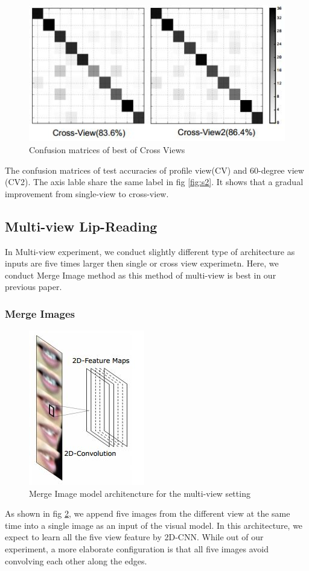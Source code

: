 \begin{figure}[h]
	\centering
	\includegraphics[width=\columnwidth]{fig/c2.jpg}
	\caption{Confusion matrices of best of  Cross Views}
	\label{fig:c2}
\end{figure}
The confusion matrices of test accuracies of profile view(CV) and 60-degree view (CV2). The axis lable share the same label in fig \ref{fig:s2}. It shows that
a gradual improvement from single-view to cross-view.  

\subsection{Multi-view Lip-Reading}
In Multi-view experiment, we conduct slightly different type of architecture as inputs are five times larger then single or cross view experimetn. Here, we conduct Merge Image method as this method of multi-view is best in our previous paper.

\subsubsection*{Merge Images}
\begin{figure}[h]
	\centering
	\includegraphics[width=0.4\columnwidth]{fig/mi.jpg}
	\caption{Merge Image model architencture for the multi-view setting}
	\label{fig:mi}
\end{figure}
As shown in fig \ref{fig:mi}, we append five images from the different
view at the same time into a single image as an input of the visual model. In this
architecture, we expect to learn all the five view feature by 2D-CNN. While out
of our experiment, a more elaborate configuration is that all five images avoid
convolving each other along the edges.

